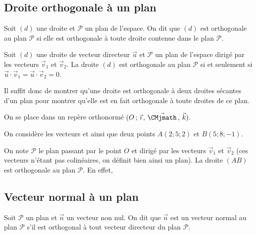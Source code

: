 \documentclass[11pt,fleqn, openany]{book} %
\begin{document}
\subsection{Droite orthogonale à un plan}

\begin{definition}Soit $(d)$ une droite et $\mathcal{P}$ un plan de l'espace. On dit que $(d)$ est orthogonale au plan $\mathcal{P}$ si elle est orthogonale à toute droite contenue dans le plan $\mathcal{P}$.\end{definition}

\begin{proposition}Soit $(d)$ une droite de vecteur directeur $\vec u$ et $\mathcal{P}$ un plan de l'espace dirigé par les vecteurs $\vec v_1$ et $\vec v_2$. La droite $(d)$ est orthogonale au plan $\mathcal{P}$ si et seulement si $\vec u \cdot \vec v_1 = \vec u \cdot \vec v_2 = 0$.\end{proposition}

Il suffit donc de montrer qu'une droite est orthogonale à deux droites sécantes d'un plan pour montrer qu'elle est en fait orthogonale à toute droites de ce plan.


\begin{example} On se place dans un repère orthonormé $\Oijk$. 

On considère les vecteurs \renewcommand{\arraystretch}{1} et \renewcommand{\arraystretch}{1} ainsi que deux points $A(2;5;2)$ et $B(5;8;-1)$.

On note $\mathcal{P}$ le plan passant par le point $O$ et dirigé par les vecteurs $\vec v_1$ et $\vec v_2$ (ces vecteurs n'étant pas colinéaires, on définit bien ainsi un plan). La droite $(AB)$ est orthogonale au plan $\mathcal{P}$. En effet,

\vskip100pt

\end{example}

\newpage

\subsection{Vecteur normal à un plan}

\begin{definition}Soit $\mathcal{P}$ un plan et $\vec n$ un vecteur non nul.
On dit que $\vec n$ est un vecteur normal au plan $\mathcal{P}$ s'il est orthogonal à tout vecteur directeur du plan $\mathcal{P}$.\end{definition}
\end{document}
